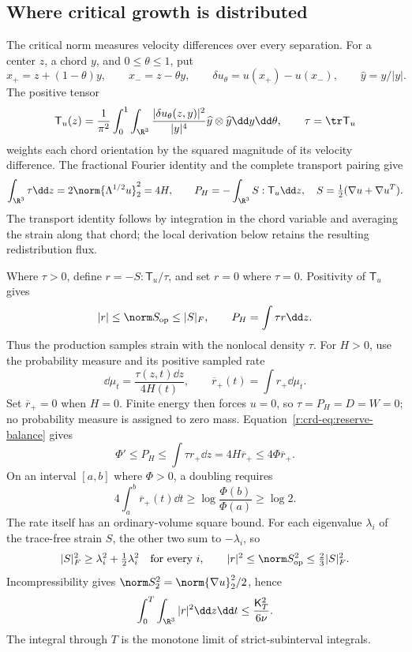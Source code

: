 \subsection{Where critical growth is distributed}

The critical norm measures velocity differences over every separation.
For a center \(z\), a chord \(y\), and \(0\le\theta\le1\), put
\[
 x_+=z+(1-\theta)y,\qquad x_-=z-\theta y,\qquad
 \delta u_\theta=u(x_+)-u(x_-),\qquad \widehat y=y/|y|.
\]
The positive tensor
\begin{equation}
 \mathsf T_u(z)=\frac1{\pi^2}\int_0^1\int_{\R^3}
 \frac{|\delta u_\theta(z,y)|^2}{|y|^4}
 \widehat y\otimes\widehat y\dd y\dd\theta,\qquad
 \tau=\tr\mathsf T_u
 \label{r:crd-eq:tensor}
\end{equation}
weights each chord orientation by the squared magnitude of its velocity difference.
The fractional Fourier identity and the complete transport pairing give
\begin{equation}
 \int_{\R^3}\tau\dd z=2\norm{\Lambda^{1/2}u}_2^2=4H,\qquad
 P_H=-\int_{\R^3}S:\mathsf T_u\dd z,
 \quad S=\tfrac12(\nabla u+\nabla u^T).
 \label{r:crd-eq:current}
\end{equation}
The transport identity follows by integration in the chord variable and
averaging the strain along that chord; the local derivation below retains
the resulting redistribution flux.

Where \(\tau>0\), define \(r=-S:\mathsf T_u/\tau\), and set \(r=0\)
where \(\tau=0\). Positivity of \(\mathsf T_u\) gives
\[
 |r|\le\norm S_{\mathrm{op}}\le |S|_F,\qquad
 P_H=\int\tau r\dd z.
\]
Thus the production samples strain with the nonlocal density \(\tau\).
For \(H>0\), use the probability measure and its positive sampled rate
\[
 \dd\mu_t=\frac{\tau(z,t)\dd z}{4H(t)},\qquad
 \overline r_+(t)=\int r_+\dd\mu_t.
\]
Set \(\overline r_+=0\) when \(H=0\). Finite energy then forces \(u=0\),
so \(\tau=P_H=D=W=0\); no probability measure is assigned to zero mass.
Equation~\eqref{r:crd-eq:reserve-balance} gives
\begin{equation}
 \Phi'\le P_H\le\int\tau r_+\dd z
 =4H\overline r_+\le4\Phi\overline r_+.
 \label{r:crd-eq:sampled-growth}
\end{equation}
On an interval \([a,b]\) where \(\Phi>0\), a doubling requires
\[
 4\int_a^b\overline r_+(t)\dd t
 \ge\log\frac{\Phi(b)}{\Phi(a)}\ge\log2.
\]
The rate itself has an ordinary-volume square bound. For each eigenvalue
\(\lambda_i\) of the trace-free strain \(S\), the other two sum to
\(-\lambda_i\), so
\[
 |S|_F^2\ge\lambda_i^2+\tfrac12\lambda_i^2
 \quad\text{for every }i,\qquad
 |r|^2\le\norm S_{\mathrm{op}}^2\le\tfrac23|S|_F^2.
\]
Incompressibility gives \(\norm S_2^2=\norm{\nabla u}_2^2/2\), hence
\begin{equation}
 \int_0^T\int_{\R^3}|r|^2\dd z\dd t
 \le\frac{\mathsf K_T^2}{6\nu}.
 \label{r:crd-eq:rate-budget}
\end{equation}
The integral through \(T\) is the monotone limit of strict-subinterval
integrals.


